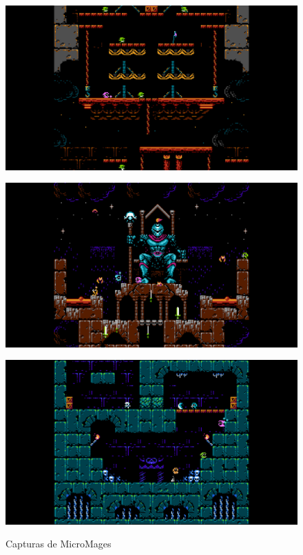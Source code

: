 \begin{figure}[H]
    \centering
    \begin{minipage}{0.43\textwidth}
        \centering
        \includegraphics[width=1.0\textwidth]{Cuerpo/4/MM1.jpg} %
        \label{UCH-Nivel}
    \end{minipage}\hfill
    \begin{minipage}{0.43\textwidth}
        \centering
        \includegraphics[width=1.0\textwidth]{Cuerpo/4/MM2.jpg} %
        \label{MM-Jefes}
    \end{minipage}
    \centering
    \begin{minipage}{0.43\textwidth}
        \centering
        \includegraphics[width=1.0\textwidth]{Cuerpo/4/MM3.jpg} %
        \label{MM-Jugadores}
    \end{minipage}
    \caption{Capturas de MicroMages}
\end{figure}

